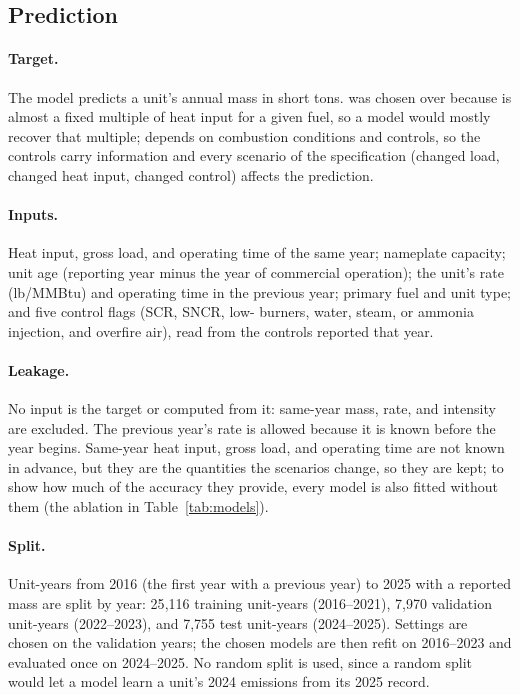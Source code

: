 \documentclass[11pt,a4paper]{article}
\begin{document}
\subsection{Prediction}
\label{sec:prediction}

\paragraph{Target.} The model predicts a unit's annual \NOx{} mass in short tons. \NOx{} was
chosen over \COtwo{} because \COtwo{} is almost a fixed multiple of heat input for a given fuel,
so a \COtwo{} model would mostly recover that multiple; \NOx{} depends on combustion conditions
and controls, so the controls carry information and every scenario of the specification
(changed load, changed heat input, changed control) affects the prediction.

\paragraph{Inputs.} Heat input, gross load, and operating time of the same year; nameplate
capacity; unit age (reporting year minus the year of commercial operation); the unit's \NOx{}
rate (lb/MMBtu) and operating time in the previous year; primary fuel and unit type; and five
\NOx{} control flags (SCR, SNCR, low-\NOx{} burners, water, steam, or ammonia injection, and
overfire air), read from the controls reported that year.

\paragraph{Leakage.} No input is the target or computed from it: same-year \NOx{} mass, \NOx{}
rate, and \NOx{} intensity are excluded. The previous year's \NOx{} rate is allowed because it is
known before the year begins. Same-year heat input, gross load, and operating time are not known
in advance, but they are the quantities the scenarios change, so they are kept; to show how much
of the accuracy they provide, every model is also fitted without them (the ablation in
Table~\ref{tab:models}).

\paragraph{Split.} Unit-years from 2016 (the first year with a previous year) to 2025 with a
reported \NOx{} mass are split by year: 25{,}116 training unit-years (2016--2021), 7{,}970
validation unit-years (2022--2023), and 7{,}755 test unit-years (2024--2025). Settings are chosen
on the validation years; the chosen models are then refit on 2016--2023 and evaluated once on
2024--2025. No random split is used, since a random split would let a model learn a unit's 2024
emissions from its 2025 record.
\end{document}
